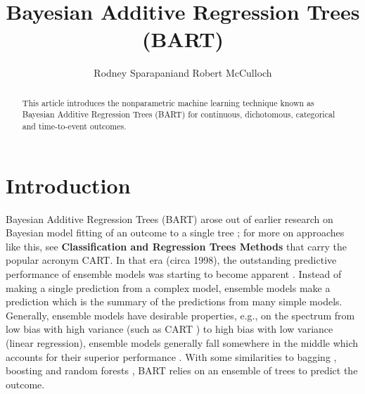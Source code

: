 \documentclass[cmbright,doublespace]{WileySTAT-V1}
\theoremstyle{plain}
\begin{document}
\title{Bayesian Additive Regression Trees (BART)}

\author{Rodney Sparapani\corrauth and
        Robert McCulloch}

\address{%
Medical College of Wisconsin, Milwaukee, WI, USA \\
Arizona State University, Tempe, AZ, USA}


\begin{abstract}
  This article introduces the nonparametric machine learning technique
  known as Bayesian Additive Regression Trees (BART) for continuous,
  dichotomous, categorical and time-to-event outcomes.
\end{abstract}


\maketitle

\section{Introduction}

Bayesian Additive Regression Trees (BART) arose out of earlier
research on Bayesian model fitting of an outcome to a single tree
\citep{ChipGeor98}; for more on approaches like this, see
\textbf{Classification and Regression Trees Methods} \citep{Loh14}
that carry the popular acronym CART.  In that era (circa 1998), the
outstanding predictive performance of ensemble models was starting to
become apparent
\citep{Brei96,KrogSoli97,FreuScha97,Brei01,Frie01,BaldBrun01}.
Instead of making a single prediction from a complex model, ensemble
models make a prediction which is the summary of the predictions from
many simple models.  Generally, ensemble models have desirable
properties, e.g., on the spectrum from low bias with high variance
(such as CART \citep{Brei17}) to high bias with low variance (linear
regression), ensemble models generally fall somewhere in the middle
which accounts for their superior performance \citep{KuhnJohn13}.
With some similarities to bagging \citep{Brei96}, boosting
\citep{FreuScha97,Frie01} and random forests \citep{Brei01}, BART
relies on an ensemble of trees to predict the outcome.
\end{document}
